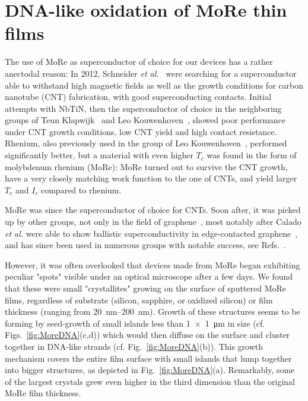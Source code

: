 \section{DNA-like oxidation of MoRe thin films}
\label{sec:more}

The use of MoRe as superconductor of choice for our devices has a rather anectodal reason:
%
In 2012, Schneider \textit{et al.}~\cite{schneiderCouplingCarbonNanotube2012,schneiderSuspendedCarbonNanotubes2014b} were searching for a superconductor able to withstand high magnetic fields as well as the growth conditions for carbon nanotube (CNT) fabrication, with good superconducting contacts.
%
Initial attempts with NbTiN, then the superconductor of choice in the neighboring groups of Teun Klapwijk~\cite{iosadSourceOptimizationMagnetron1999} and Leo Kouwenhoven~\cite{mourikSignaturesMajoranaFermions2012}, showed poor performance under CNT growth conditions, low CNT yield and high contact resistance.
%
Rhenium, also previously used in the group of Leo Kouwenhoven~\cite{keijzersJosephsonEffectsCarbon2012}, performed significantly better, but a material with even higher $T_c$ was found in the form of molybdenum rhenium (MoRe):
%
MoRe turned out to survive the CNT growth, have a very closely matching work function to the one of CNTs, and yield larger $T_c$ and $I_c$ compared to rhenium.

MoRe was since the superconductor of choice for CNTs.
%
Soon after, it was picked up by other groups, not only in the field of graphene~\cite{azizMolybdenumrheniumSuperconductingSuspended2014a}, most notably after Calado \textit{et al.} were able to show ballistic superconductivity in edge-contacted graphene~\cite{caladoBallisticJosephsonJunctions2015d}, and has since been used in numerous groups with notable success, see Refs.~\cite{singhMolybdenumrheniumAlloyBased2014,gotzCosputteredMoReThin2016,blienCarbonNanotubeGrowth2016a,draelosSupercurrentFlowMultiterminal2019,ametSupercurrentQuantumHall2016b,islandThicknessDependentInterlayer2016a,krollMagneticFieldCompatible2018}.


However, it was often overlooked that devices made from MoRe began exhibiting peculiar "spots" visible under an optical microscope after a few days.
% 
We found that these were small "crystallites" growing on the surface of sputtered MoRe films, regardless of substrate (silicon, sapphire, or oxidized silicon) or film thickness (ranging from \SIrange{20}{200}{\nano\meter}).
%
Growth of these structures seems to be forming by seed-growth of small islands less than \SI{1x1}{\micro\meter} in size (cf. Figs.~\ref{fig:MoreDNA}(c,d)) which would then diffuse on the surface and cluster together in DNA-like strands (cf. Fig.~\ref{fig:MoreDNA}(b)).
%
This growth mechanism covers the entire film surface with small islands that lump together into bigger structures, as depicted in Fig.~\ref{fig:MoreDNA}(a).
%
Remarkably, some of the largest crystals grew even higher in the third dimension than the original MoRe film thickness.

